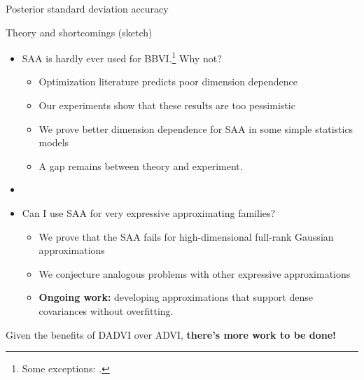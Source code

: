 \documentclass[8pt]{beamer}\usepackage[]{graphicx}\usepackage[]{color}
\begin{document}

\begin{frame}{Posterior standard deviation accuracy}
    \PosteriorSdAccuracy{}
\end{frame}


\begin{frame}{Theory and shortcomings (sketch)}
    \begin{itemize}
        \item SAA is hardly ever used for BBVI.\footnote{Some exceptions:
        \citet{giordano:2018:covariances,giordano:2022:bnp,wycoff:2022:sparsebayesianlasso,
               burroni:2023:saabbvi,campbell:2026:LargescaleEmpiricalTuning2026}.}
        Why not?
        \begin{itemize}
            \item Optimization literature predicts poor
            dimension dependence \citep{nemirovski:2009:sgdvsfixed}
            \item Our experiments show that these results are too pessimistic
            \item We prove better dimension dependence for SAA in some
            simple statistics models
            \item A gap remains between theory and experiment.
        \end{itemize}
        \pause
        \item[]
        \item Can I use SAA for very expressive approximating families?
        \begin{itemize}
            \item We prove that the SAA fails for high-dimensional full-rank
                Gaussian approximations
            \item We conjecture analogous problems with other 
                expressive approximations
            \item \textbf{Ongoing work:} developing approximations that support
                 dense covariances without overfitting.
        \end{itemize}
    \end{itemize}

    \vspace{1em}
    Given the benefits of DADVI over ADVI,
    \textbf{there's more work to be done!}
\end{frame}
\end{document}
